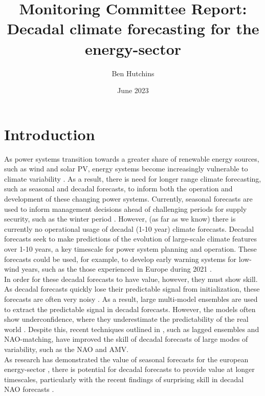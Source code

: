 \documentclass{article}
\title{Monitoring Committee Report: \\
\large Decadal climate forecasting for the energy-sector}
\author{Ben Hutchins}
\date{June 2023}
\begin{document}
\maketitle

\section*{Introduction}

As power systems transition towards a greater share of renewable energy sources, such as wind and solar PV, energy systems become increasingly vulnerable to climate variability \parencite{bloomfield2016quantifying}. As a result, there is need for longer range climate forecasting, such as seasonal and decadal forecasts, to inform both the operation and development of these changing power systems. Currently, seasonal forecasts are used to inform management decisions ahead of challenging periods for supply security, such as the winter period \parencite{national_grid_winter_2022}. However, (as far as we know) there is currently no operational usage of decadal (1-10 year) climate forecasts. Decadal forecasts seek to make predictions of the evolution of large-scale climate features over 1-10 years, a key timescale for power system planning and operation. These forecasts could be used, for example, to develop early warning systems for low-wind years, such as the those experienced in Europe during 2021 \parencite{copernicus_climate_change_service_c3s_european_2022}.\\

In order for these decadal forecasts to have value, however, they must show skill. As decadal forecasts quickly lose their predictable signal from initialization, these forecasts are often very noisy \parencite{eade2014seasonal}. As a result, large multi-model ensembles are used to extract the predictable signal in decadal forecasts. However, the models often show underconfidence, where they underestimate the predictability of the real world \parencite{eade2014seasonal}. Despite this, recent techniques outlined in \cite{smith2020north}, such as lagged ensembles and NAO-matching, have improved the skill of decadal forecasts of large modes of variability, such as the NAO and AMV.\\

As research has demonstrated the value of seasonal forecasts for the european energy-sector \parencite{clark2017skilful,thornton2019skilful}, there is potential for decadal forecasts to provide value at longer timescales, particularly with the recent findings of surprising skill in decadal NAO forecasts \parencite{smith2020north}.
\end{document}
